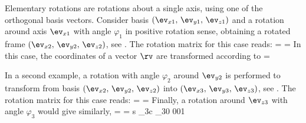 Elementary rotations are rotations about a single axis, using one of the orthogonal basis vectors.
Consider basis $(\ev_{x1},\,\ev_{y1},\,\ev_{z1})$ and a rotation around axis $\ev_{x1}$ with angle $\varphi_1$ in positive rotation sense, obtaining a rotated frame $(\ev_{x2},\,\ev_{y2},\,\ev_{z2})$, see .
The rotation matrix for this case reads:
\be
   =  = 
  \eqDot
\ee
%  
In this case, the coordinates of a vector $\rv$ are transformed according to
\be
   =  
\ee

%
In a second example, a rotation with angle $\varphi_2$ around $\ev_{y2}$ is performed to transform from basis $(\ev_{x2},\,\ev_{y2},\,\ev_{z2})$ into $(\ev_{x3},\,\ev_{y3},\,\ev_{z3})$, see .
The rotation matrix for this case reads:
\be
   =  = 
  \eqDot
\ee
%
%
Finally, a rotation around $\ev_{z3}$ with angle $\varphi_3$ would give similarly,
\be
   =  = 
   {s \varphi_3}{c \varphi_3}{0} {0}{0}{1} \eqDot
\ee




